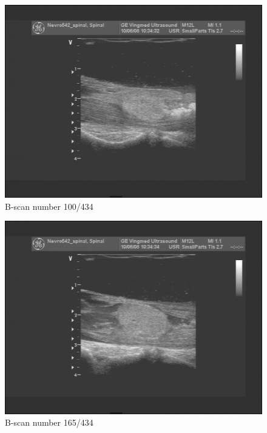 \begin{figure}[h]
\centering
\includegraphics[height=0.45\textheight]{graphics/100.png}
\caption{B-scan number 100/434}
\label{fig:100}
\end{figure}

\begin{figure}[h]
\centering
\includegraphics[height=0.45\textheight]{graphics/165.png}
\caption{B-scan number 165/434}
\label{fig:165}
\end{figure}

